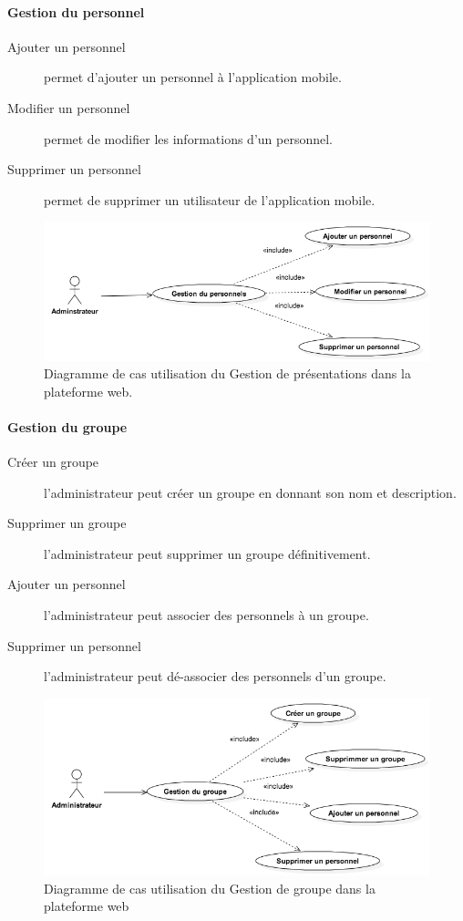 \documentclass[12pt, ChapStyle1, oneside]{./Styles/Dea_Gsm}
\begin{document}
\paragraph{Gestion du personnel}
\begin{description}
  \item[Ajouter un personnel] permet d'ajouter un personnel à l'application mobile.
    \item[Modifier un personnel] permet de modifier les informations d'un personnel.
    \item[Supprimer un personnel] permet de supprimer un utilisateur de l'application mobile.
\end{description}
\begin{figure}[H]
    \centering
    \includegraphics[width=5.0in]{UseCaseGestionPersonnel}
    \caption{Diagramme de cas utilisation du Gestion de présentations dans la plateforme web.}
    \label{UseCaseDiagramWeb}
\end{figure}

\paragraph{Gestion du groupe}
\begin{description}
    \item[Créer un groupe] l'administrateur peut créer un groupe en donnant son nom et description.
    \item[Supprimer un groupe] l'administrateur peut supprimer un groupe définitivement.
    \item[Ajouter un personnel] l'administrateur peut associer des personnels à un groupe.
    \item[Supprimer un personnel] l'administrateur peut dé-associer des personnels d'un groupe.
\end{description}

\begin{figure}[H]
    \centering
    \includegraphics[width=5.0in]{UseCaseGestionGroupe}
    \caption{Diagramme de cas utilisation du Gestion de groupe dans la plateforme web}
    \label{UseCaseDiagramWeb}
\end{figure}
\end{document}
